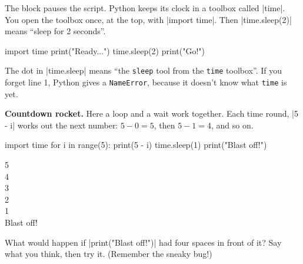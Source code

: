 The  block pauses the script. Python keeps its clock in a toolbox called \py|time|. You open the toolbox once, at the top, with \py|import time|. Then \py|time.sleep(2)| means ``sleep for 2 seconds''.

\begin{tcbraster}[raster columns=2, raster equal height=rows, raster column skip=12pt, raster valign=center]
\begin{tcolorbox}[colback=white, colframe=white, boxrule=0pt, valign=center]
\begin{scratch}[scale=0.85]
\end{scratch}
\end{tcolorbox}
\begin{code}
import time
print("Ready...")
time.sleep(2)
print("Go!")
\end{code}
\end{tcbraster}

The dot in \py|time.sleep| means ``the \texttt{sleep} tool from the \texttt{time} toolbox''. If you forget line 1, Python gives a \texttt{NameError}, because it doesn't know what \texttt{time} is yet.

\textbf{Countdown rocket.} Here a loop and a wait work together. Each time round, \py|5 - i| works out the next number: $5-0=5$, then $5-1=4$, and so on.

\begin{tcbraster}[raster columns=2, raster equal height=rows, raster column skip=12pt, raster valign=center]
\begin{code}
import time
for i in range(5):
    print(5 - i)
    time.sleep(1)
print("Blast off!")
\end{code}
\begin{outputbox}
5\\
4\\
3\\
2\\
1\\
Blast off!
\end{outputbox}
\end{tcbraster}

\begin{think}
What would happen if \py|print("Blast off!")| had four spaces in front of it? Say what you think, then try it. (Remember the sneaky bug!)
\end{think}

